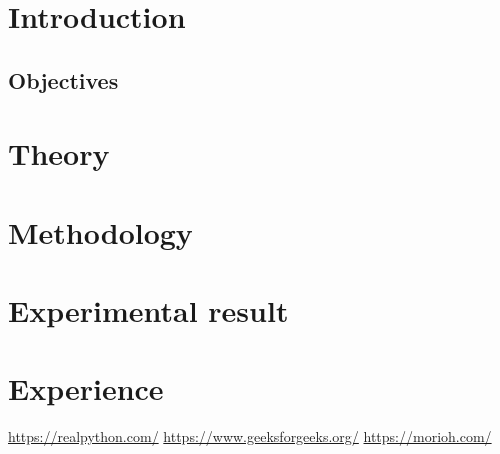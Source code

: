 \documentclass[11pt]{article}
\begin{document}
\section{Introduction}


\subsection{Objectives}

\section{Theory}

\section{Methodology}

\section{Experimental result}

\section{Experience}

\begin{thebibliography}{1}
     \url{https://realpython.com/}
     \url{https://www.geeksforgeeks.org/}
     \url{https://morioh.com/}
\end{thebibliography}
\end{document}
